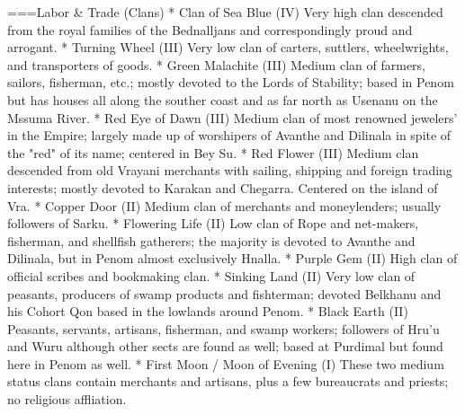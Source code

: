 ===Labor \& Trade (Clans)
* Clan of Sea Blue (IV) Very high clan descended from the royal families of the Bednalljans and correspondingly proud and arrogant. 
* Turning Wheel (III) Very low clan of carters, suttlers, wheelwrights, and transporters of goods. 
* Green Malachite (III) Medium clan of farmers, sailors, fisherman, etc.; mostly devoted to the Lords of Stability; based in Penom but has houses all along the souther coast and as far north as Usenanu on the Mssuma River. 
* Red Eye of Dawn (III) Medium clan of most renowned jewelers' in the Empire; largely made up of worshipers of Avanthe and Dilinala in spite of the "red" of its name; centered in Bey Su.
* Red Flower (III) Medium clan descended from old Vrayani merchants with sailing, shipping and foreign trading interests; mostly devoted to Karakan and Chegarra. Centered on the island of Vra.
* Copper Door (II) Medium clan of merchants and moneylenders; usually followers of Sarku. 
* Flowering Life (II) Low clan of Rope and net-makers, fisherman, and shellfish gatherers; the majority is devoted to Avanthe and Dilinala, but in Penom almost exclusively Hnalla.     
* Purple Gem (II) High clan of official scribes and bookmaking clan.
* Sinking Land (II) Very low clan of peasants, producers of swamp products and fishterman; devoted Belkhanu and his Cohort Qon based in the lowlands around Penom. 
* Black Earth (II) Peasants, servants, artisans, fisherman, and swamp workers; followers of Hru'u and Wuru although other sects are found as well; based at Purdimal but found here in Penom as well.
* First Moon / Moon of Evening (I) These two medium status clans contain merchants and artisans, plus a few bureaucrats and priests; no religious affliation.

